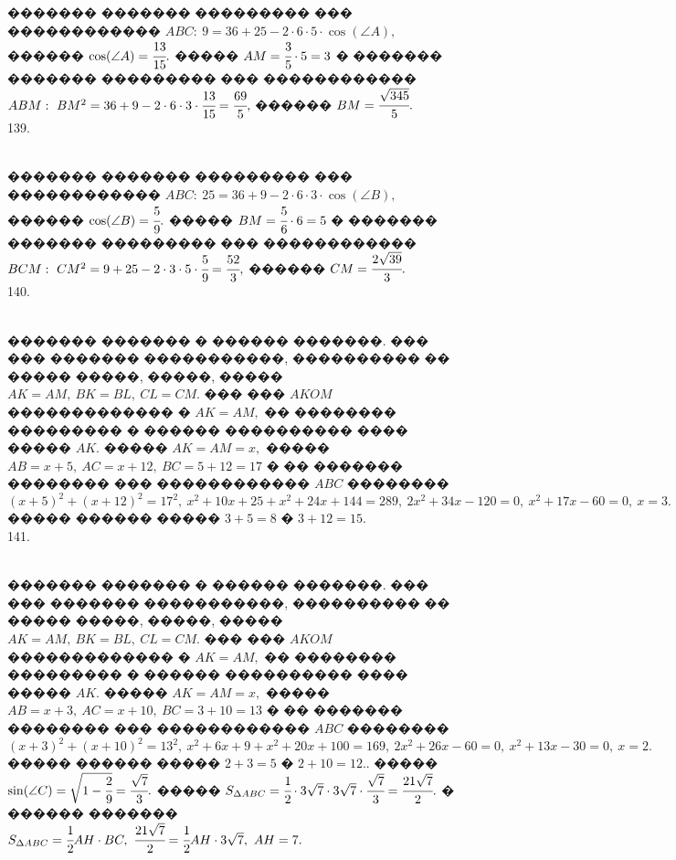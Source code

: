 \documentclass[12pt]{article}
\begin{document}
������� ������� ��������� ��� ������������ $ABC:\ 9=36+25-2\cdot6\cdot5\cdot\cos(\angle A),$ ������ $\cos(\angle A)=\cfrac{13}{15}.$ ����� $AM=\cfrac{3}{5}\cdot5=3$ � ������� ������� ��������� ��� ������������ $ABM:\ BM^2=36+9-2\cdot6\cdot3\cdot\cfrac{13}{15}=\cfrac{69}{5},$ ������ $BM=\cfrac{\sqrt{345}}{5}.$\\
139. \begin{figure}[ht!]
\end{figure}\\
������� ������� ��������� ��� ������������ $ABC:\ 25=36+9-2\cdot6\cdot3\cdot\cos(\angle B),$ ������ $\cos(\angle B)=\cfrac{5}{9}.$ ����� $BM=\cfrac{5}{6}\cdot6=5$ � ������� ������� ��������� ��� ������������ $BCM:\ CM^2=9+25-2\cdot3\cdot5\cdot\cfrac{5}{9}=\cfrac{52}{3},$ ������ $CM=\cfrac{2\sqrt{39}}{3}.$\\
140. \begin{figure}[ht!]
\end{figure}\\
������� ������� � ������ �������. ��� ��� ������� �����������, ���������� �� ����� �����, �����, ����� $AK=AM,\ BK=BL,\ CL=CM.$ ��� ��� $AKOM$ ������������� � $AK=AM,$ �� �������� ��������� � ������ ���������� ���� ����� $AK.$ ����� $AK=AM=x,$ ����� $AB=x+5,\ AC=x+12,\ BC=5+12=17$ � �� ������� �������� ��� ������������ $ABC$ �������� $(x+5)^2+(x+12)^2=17^2,\ x^2+10x+25+x^2+24x+144=289,\ 2x^2+34x-120=0,\ x^2+17x-60=0,\ x=3.$ ����� ������ ����� $3+5=8$ � $3+12=15.$\\
141. \begin{figure}[ht!]
\end{figure}\\
������� ������� � ������ �������. ��� ��� ������� �����������, ���������� �� ����� �����, �����, ����� $AK=AM,\ BK=BL,\ CL=CM.$ ��� ��� $AKOM$ ������������� � $AK=AM,$ �� �������� ��������� � ������ ���������� ���� ����� $AK.$ ����� $AK=AM=x,$ ����� $AB=x+3,\ AC=x+10,\ BC=3+10=13$ � �� ������� �������� ��� ������������ $ABC$ �������� $(x+3)^2+(x+10)^2=13^2,\ x^2+6x+9+x^2+20x+100=169,\ 2x^2+26x-60=0,\ x^2+13x-30=0,\ x=2.$ ����� ������ ����� $2+3=5$ � $2+10=12.$\newpage{}. ����� $\sin(\angle C)=\sqrt{1-\cfrac{2}{9}}=\cfrac{\sqrt{7}}{3}.$ ����� $S_{\Delta ABC}=\cfrac{1}{2}\cdot3\sqrt{7}\cdot3\sqrt{7}\cdot\cfrac{\sqrt{7}}{3}=
\cfrac{21\sqrt{7}}{2}.$ � ������ ������� $S_{\Delta ABC}=\cfrac{1}{2}AH\cdot BC,\ \cfrac{21\sqrt{7}}{2}=\cfrac{1}{2}AH\cdot3\sqrt{7},\ AH=7.$\\
\end{document}
